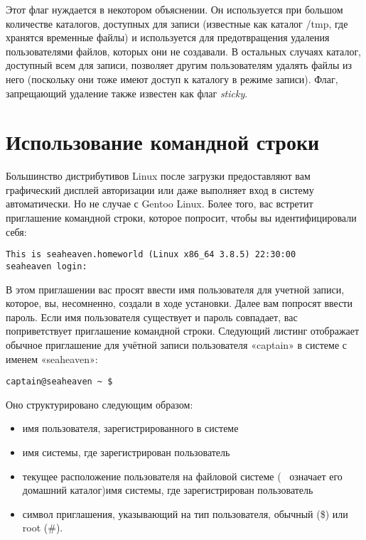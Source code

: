 \documentclass[12pt]{book}
\begin{document}
Этот флаг нуждается в некотором объяснении.  Он используется при большом количестве каталогов, доступных для записи (известные как каталог /tmp, где хранятся временные файлы) и используется для предотвращения удаления пользователями файлов, которых они не создавали. В остальных случаях каталог, доступный всем для записи, позволяет другим пользователям удалять файлы из него (поскольку они тоже имеют доступ к каталогу в режиме записи). Флаг, запрещающий удаление также известен как флаг \emph{sticky}.

\section{Использование командной строки}

Большинство дистрибутивов Linux после загрузки предоставляют вам графический дисплей авторизации или даже выполняет вход в систему автоматически. Но не случае с Gentoo Linux. Более того, вас встретит приглашение командной строки, которое попросит, чтобы вы идентифицировали себя:

\vspace{3mm}
\begin{tcolorbox}
\begin{lstlisting}
This is seaheaven.homeworld (Linux x86_64 3.8.5) 22:30:00
seaheaven login:
\end{lstlisting}
\end{tcolorbox}

В этом приглашении вас просят ввести  имя пользователя для учетной записи, которое, вы, несомненно, создали  в ходе установки. Далее вам попросят ввести пароль. Если имя пользователя существует и пароль совпадает, вас поприветствует приглашение командной строки. Следующий листинг отображает обычное приглашение для учётной записи пользователя «captain» в системе с именем «seaheaven»:

\vspace{3mm}
\begin{tcolorbox}
\begin{lstlisting}
captain@seaheaven ~ $
\end{lstlisting}
\end{tcolorbox}

Оно структурировано следующим образом:

\begin{itemize}
	\item имя пользователя, зарегистрированного в системе
	\item имя системы, где зарегистрирован пользователь
	\item текущее расположение пользователя на файловой системе (~ означает его домашний каталог)имя системы, где зарегистрирован пользователь
	\item символ приглашения, указывающий на тип пользователя, обычный (\$) или root (\#).
\end{itemize}
\end{document}
